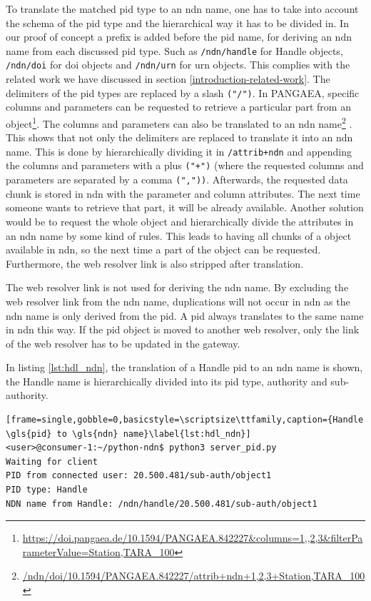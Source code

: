 To translate the matched \gls{pid} type to an \gls{ndn} name, one has to take into account the schema of the \gls{pid} type and the hierarchical way it has to be divided in. In our proof of concept a prefix is added before the \gls{pid} name, for deriving an \gls{ndn} name from each discussed \gls{pid} type. Such as \texttt{/ndn/handle} for Handle objects, \texttt{/ndn/doi} for \gls{doi} objects and \texttt{/ndn/urn} for \gls{urn} objects. This complies with the related work we have discussed in section \ref{introduction-related-work}. The delimiters of the \gls{pid} types are replaced by a slash \texttt{("/")}. In PANGAEA, specific columns and parameters can be requested to retrieve a particular part from an object\footnote{\url{https://doi.pangaea.de/10.1594/PANGAEA.842227&columns=1,,2,3&filterParameterValue=Station,TARA_100}}. The columns and parameters can also be translated to an \gls{ndn} name\footnote{\url{/ndn/doi/10.1594/PANGAEA.842227/attrib+ndn+1,2,3+Station,TARA_100}} \cite{ndn-app-aware}. This shows that not only the delimiters are replaced to translate it into an \gls{ndn} name. This is done by hierarchically dividing it in \texttt{/attrib+ndn} and appending the columns and parameters with a plus \texttt{("+")} (where the requested columns and parameters are separated by a comma \texttt{(","))}. 
Afterwards, the requested data chunk is stored in \gls{ndn} with the parameter and column attributes. The next time someone wants to retrieve that part, it will be already available. Another solution would be to request the whole object and hierarchically divide the attributes in an \gls{ndn} name by some kind of rules. This leads to having all chunks of a object available in \gls{ndn}, so the next time a part of the object can be requested.
Furthermore, the web resolver link is also stripped after translation.

The web resolver link is not used for deriving the \gls{ndn} name.
By excluding the web resolver link from the \gls{ndn} name, duplications will not occur in \gls{ndn} as the \gls{ndn} name is only derived from the \gls{pid}. A \gls{pid} always translates to the same name in \gls{ndn} this way. 
If the \gls{pid} object is moved to another web resolver, only the link of the web resolver has to be updated in the gateway. 

In listing \ref{lst:hdl_ndn}, the translation of a Handle \gls{pid} to an \gls{ndn} name is shown, the Handle name is hierarchically divided into its \gls{pid} type, authority and sub-authority.
\vspace{1em}
\begin{lstlisting}[frame=single,gobble=0,basicstyle=\scriptsize\ttfamily,caption={Handle \gls{pid} to \gls{ndn} name}\label{lst:hdl_ndn}]
<user>@consumer-1:~/python-ndn$ python3 server_pid.py
Waiting for client
PID from connected user: 20.500.481/sub-auth/object1
PID type: Handle
NDN name from Handle: /ndn/handle/20.500.481/sub-auth/object1
\end{lstlisting}

